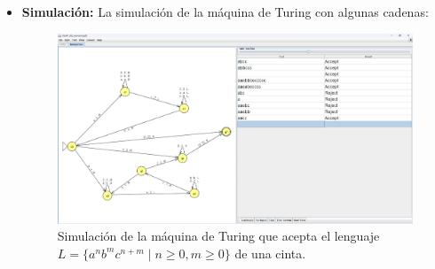\documentclass[11pt]{report}
\begin{document}
\begin{itemize}
  \item \textbf{Simulación:} La simulación de la máquina de Turing con algunas cadenas:
        \begin{figure}[H]
          \centering
          \includegraphics[scale=0.33]{img/MT_02_one_ribbon_simulation.png}
          \caption{Simulación de la máquina de Turing que acepta el lenguaje $L = \{a^nb^mc^{n+m} \mid n \geq 0, m \geq 0\}$ de una cinta.}
          \label{fig:simulacion de la maquina de turing que acepta el lenguaje L = {a^nb^mc^{n+m} | n >= 0, m >= 0}}
        \end{figure}
\end{itemize}

\newpage
\end{document}

